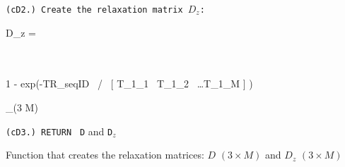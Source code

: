 \begin{algorithm}
    \texttt{(cD2.) Create the relaxation matrix $D_z$: } 
    \begin{flalign*}
    D_z = 
    \begin{bmatrix}
    	 \\
         \\
        1 - exp(-TR_{seqID} \, / \, [ T_{1_{1}}  \, T_{1_{2}} \, \dots T_{1_{M}} ] ) 
    \end{bmatrix}_{(3 \times M)}
    \end{flalign*}
    
    \texttt{(cD3.) RETURN } \texttt{D} and \texttt{D$_z$} \;
    
    \caption{Function that creates the relaxation matrices: $D$ $(3 \times M)$ and $D_z$ $(3 \times M)$}
    \label{alg:createD}
\end{algorithm}